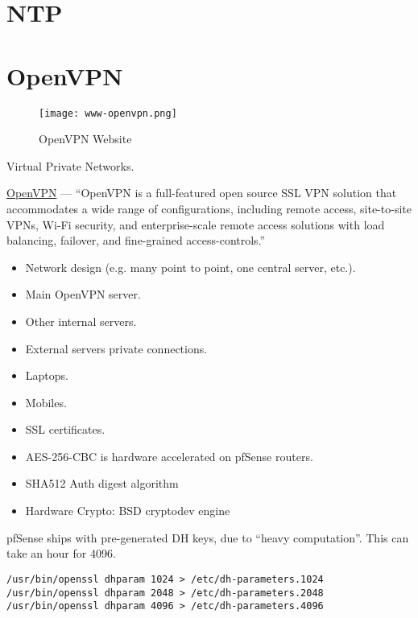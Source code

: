 \section{NTP}


\section{OpenVPN}
\begin{figure}[h!]
\begin{center}
\texttt{[image: www-openvpn.png]}
 \caption{OpenVPN Website}
 \label{fig:www-openvpn}
\end{center}
\end{figure}


Virtual Private Networks.


\href{https://www.openvpn.net/}{OpenVPN} --- ``OpenVPN is a full-featured open source SSL VPN solution that accommodates a wide range of configurations, including remote access, site-to-site VPNs, Wi-Fi security, and enterprise-scale remote access solutions with load balancing, failover, and fine-grained access-controls.''

\begin{itemize}
 \item Network design (e.g. many point to point, one central server, etc.).
 \item Main OpenVPN server.
 \item Other internal servers.
 \item External servers private connections.
 \item Laptops.
 \item Mobiles.
 \item SSL certificates.
 \item AES-256-CBC is hardware accelerated on pfSense routers.
 \item SHA512 Auth digest algorithm
 \item Hardware Crypto: BSD cryptodev engine
\end{itemize}


pfSense ships with pre-generated DH keys, due to ``heavy computation''.
This can take an hour for 4096.
\begin{verbatim}
/usr/bin/openssl dhparam 1024 > /etc/dh-parameters.1024
/usr/bin/openssl dhparam 2048 > /etc/dh-parameters.2048
/usr/bin/openssl dhparam 4096 > /etc/dh-parameters.4096
\end{verbatim}




